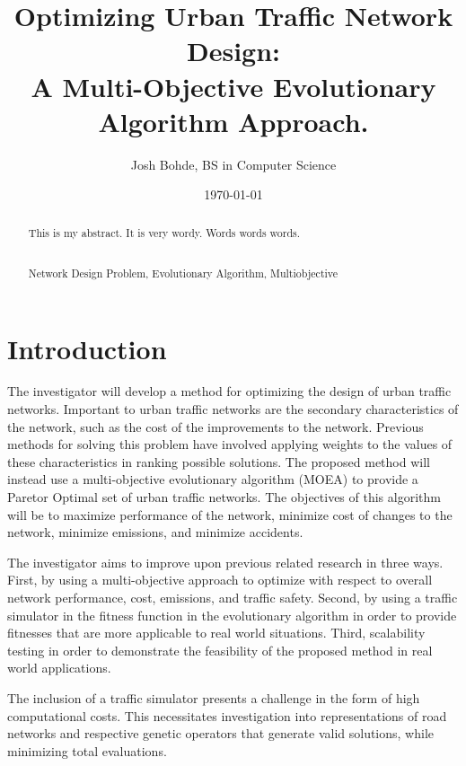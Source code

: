 \documentclass[11pt, oneside, notitlepage, draft]{article}
\newcommand{\keywords}[1]{\par\addvspace\baselineskip
\noindent\enspace\ignorespaces\centering{\bf Keywords}\\#1}
\begin{document}
\title{Optimizing Urban Traffic Network Design:\\ A Multi-Objective Evolutionary Algorithm Approach.}
\author{Josh Bohde, BS in Computer Science}
\date{\today}
\maketitle

\begin{abstract}
This is my abstract. It is very wordy. Words words words.
\keywords{Network Design Problem, Evolutionary Algorithm, Multiobjective}
\end{abstract}

\clearpage
\section{Introduction}
    The investigator will develop a method for optimizing the design of urban traffic networks. Important to urban traffic networks are the secondary characteristics of the network, such as the cost of the improvements to the network. Previous methods for solving this problem have involved applying weights to the values of these characteristics in ranking possible solutions. The proposed method will instead use a multi-objective evolutionary algorithm (MOEA) to provide a Paretor Optimal set of urban traffic networks. The objectives of this algorithm will be to maximize performance of the network, minimize cost of changes to the network, minimize emissions, and minimize accidents.

    The investigator aims to improve upon previous related research in three ways. First, by using a multi-objective approach to optimize with respect to overall network performance, cost, emissions, and traffic safety. Second, by using a traffic simulator in the fitness function in the evolutionary algorithm in order to provide fitnesses that are more applicable to real world situations. Third, scalability testing in order to demonstrate the feasibility of the proposed method in real world applications.

    The inclusion of a traffic simulator presents a challenge in the form of high computational costs. This necessitates investigation into representations of road networks and respective genetic operators that generate valid solutions, while minimizing total evaluations.
\end{document}
